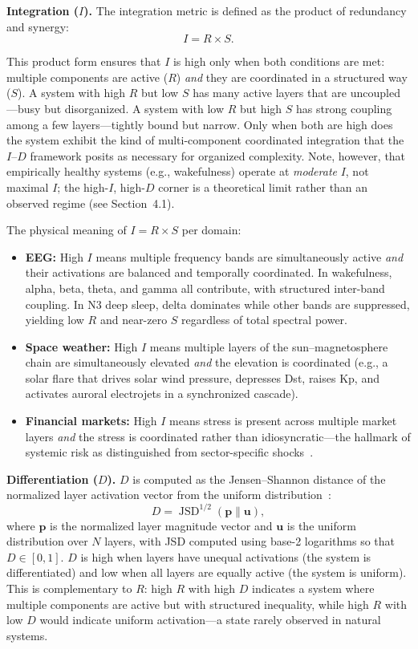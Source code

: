 \documentclass[12pt,a4paper]{article}
\begin{document}
\textbf{Integration ($I$).} The integration metric is defined as the product of redundancy and synergy:
\begin{equation}
I = R \times S.
\end{equation}

This product form ensures that $I$ is high only when both conditions are met: multiple components are active ($R$) \emph{and} they are coordinated in a structured way ($S$). A system with high $R$ but low $S$ has many active layers that are uncoupled---busy but disorganized. A system with low $R$ but high $S$ has strong coupling among a few layers---tightly bound but narrow. Only when both are high does the system exhibit the kind of multi-component coordinated integration that the $I$--$D$ framework posits as necessary for organized complexity. Note, however, that empirically healthy systems (e.g., wakefulness) operate at \emph{moderate} $I$, not maximal $I$; the high-$I$, high-$D$ corner is a theoretical limit rather than an observed regime (see Section~4.1).

The physical meaning of $I = R \times S$ per domain:
\begin{itemize}
\item \textbf{EEG:} High $I$ means multiple frequency bands are simultaneously active \emph{and} their activations are balanced and temporally coordinated. In wakefulness, alpha, beta, theta, and gamma all contribute, with structured inter-band coupling. In N3 deep sleep, delta dominates while other bands are suppressed, yielding low $R$ and near-zero $S$ regardless of total spectral power.
\item \textbf{Space weather:} High $I$ means multiple layers of the sun--magnetosphere chain are simultaneously elevated \emph{and} the elevation is coordinated (e.g., a solar flare that drives solar wind pressure, depresses Dst, raises Kp, and activates auroral electrojets in a synchronized cascade).
\item \textbf{Financial markets:} High $I$ means stress is present across multiple market layers \emph{and} the stress is coordinated rather than idiosyncratic---the hallmark of systemic risk as distinguished from sector-specific shocks~\cite{forbes2002}.
\end{itemize}

\textbf{Differentiation ($D$).} $D$ is computed as the Jensen--Shannon distance of the normalized layer activation vector from the uniform distribution~\cite{lin1991,endres2003}:
\begin{equation}
D = \operatorname{JSD}^{1/2}\left(\mathbf{p} \| \mathbf{u}\right),
\end{equation}
where $\mathbf{p}$ is the normalized layer magnitude vector and $\mathbf{u}$ is the uniform distribution over $N$ layers, with JSD computed using base-2 logarithms so that $D \in [0, 1]$. $D$ is high when layers have unequal activations (the system is differentiated) and low when all layers are equally active (the system is uniform). This is complementary to $R$: high $R$ with high $D$ indicates a system where multiple components are active but with structured inequality, while high $R$ with low $D$ would indicate uniform activation---a state rarely observed in natural systems.
\end{document}
